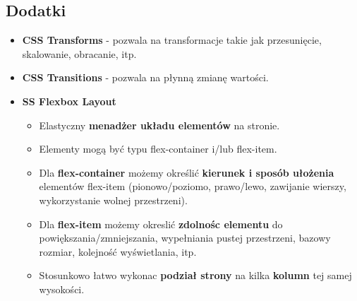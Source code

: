 \documentclass[../main.tex]{subfiles}
\begin{document}
    \subsection{Dodatki}
    \begin{itemize}
        \item \textbf{CSS Transforms} - pozwala na transformacje takie jak przesunięcie, skalowanie, obracanie, itp.
        \item \textbf{CSS Transitions} - pozwala na płynną zmianę wartości.
        \item \textbf{SS Flexbox Layout}
        \begin{itemize}
            \item Elastyczny \textbf{menadżer układu elementów} na stronie.
            \item Elementy mogą być typu flex-container i/lub flex-item.
            \item Dla \textbf{flex-container} możemy określić \textbf{kierunek i sposób ułożenia} elementów flex-item (pionowo/poziomo, prawo/lewo, zawijanie wierszy, wykorzystanie wolnej przestrzeni).
            \item Dla \textbf{flex-item} możemy okreslić \textbf{zdolnośc elementu} do powiększania/zmniejszania, wypełniania pustej przestrzeni, bazowy rozmiar, kolejność wyświetlania, itp.
            \item Stosunkowo łatwo wykonac \textbf{podział strony} na kilka \textbf{kolumn} tej samej wysokości.
        \end{itemize}
    \end{itemize}
\end{document}
